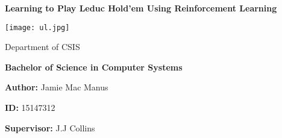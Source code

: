
\begin{titlepage}

    \begin{center}

        \vspace*{1.5cm}

        \Huge

        \textbf{Learning to Play Leduc Hold'em Using Reinforcement Learning}

        \texttt{[image: ul.jpg]}

        \Large
        Department of CSIS

        \vspace{.25cm}
        \textbf{Bachelor of Science in Computer Systems}

        \vspace{.25cm}
        \textbf{Author: } Jamie Mac Manus

        \vspace{.25cm}
        \textbf{ID: } 15147312

        \vspace{.25cm}
        \textbf{Supervisor: } J.J Collins

    \end{center}

\end{titlepage}